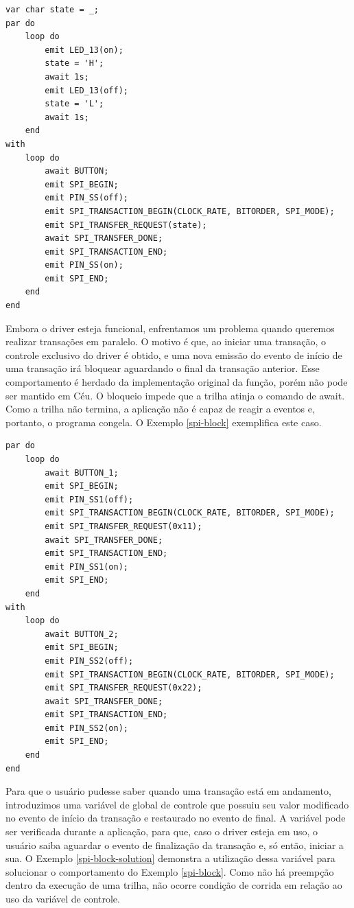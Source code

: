 \documentclass[11pt]{article}
\begin{document}
\begin{lstlisting}[style=CStyle,label=spi-ceu,caption=Aplicação utilizando driver SPI em Céu]
var char state = _;
par do
    loop do
        emit LED_13(on);
        state = 'H';
        await 1s;
        emit LED_13(off);
        state = 'L';
        await 1s;
    end
with
    loop do
        await BUTTON;
        emit SPI_BEGIN;
        emit PIN_SS(off);
        emit SPI_TRANSACTION_BEGIN(CLOCK_RATE, BITORDER, SPI_MODE);
        emit SPI_TRANSFER_REQUEST(state);
        await SPI_TRANSFER_DONE;
        emit SPI_TRANSACTION_END;
        emit PIN_SS(on);
        emit SPI_END;
    end
end
\end{lstlisting}
\par Embora o driver esteja funcional, enfrentamos um problema quando queremos realizar transações em paralelo. O motivo é que, ao iniciar uma transação, o controle exclusivo do driver é obtido, e uma nova emissão do evento de início de uma transação irá bloquear aguardando o final da transação anterior. Esse comportamento é herdado da implementação original da função, porém não pode ser mantido em Céu. O bloqueio impede que a trilha atinja o comando de await. Como a trilha não termina, a aplicação não é capaz de reagir a eventos e, portanto, o programa congela. O Exemplo \ref{spi-block} exemplifica este caso.
\begin{lstlisting}[style=CStyle,label=spi-block,caption=Aplicação congela pelas transações concorrentes]
par do
    loop do
        await BUTTON_1;
        emit SPI_BEGIN;
        emit PIN_SS1(off);
        emit SPI_TRANSACTION_BEGIN(CLOCK_RATE, BITORDER, SPI_MODE);
        emit SPI_TRANSFER_REQUEST(0x11);
        await SPI_TRANSFER_DONE;
        emit SPI_TRANSACTION_END;
        emit PIN_SS1(on);
        emit SPI_END;
    end
with
    loop do
        await BUTTON_2;
        emit SPI_BEGIN;
        emit PIN_SS2(off);
        emit SPI_TRANSACTION_BEGIN(CLOCK_RATE, BITORDER, SPI_MODE);
        emit SPI_TRANSFER_REQUEST(0x22);
        await SPI_TRANSFER_DONE;
        emit SPI_TRANSACTION_END;
        emit PIN_SS2(on);
        emit SPI_END;
    end
end
\end{lstlisting}
\par Para que o usuário pudesse saber quando uma transação está em andamento, introduzimos uma variável de global de controle que possuiu seu valor modificado no evento de início da transação e restaurado no evento de final. A variável pode ser verificada durante a aplicação, para que, caso o driver esteja em uso, o usuário saiba aguardar o evento de finalização da transação e, só então, iniciar a sua. O Exemplo \ref{spi-block-solution} demonstra a utilização dessa variável para solucionar o comportamento do Exemplo \ref{spi-block}. Como não há preempção dentro da execução de uma trilha, não ocorre condição de corrida em relação ao uso da variável de controle.
\end{document}

